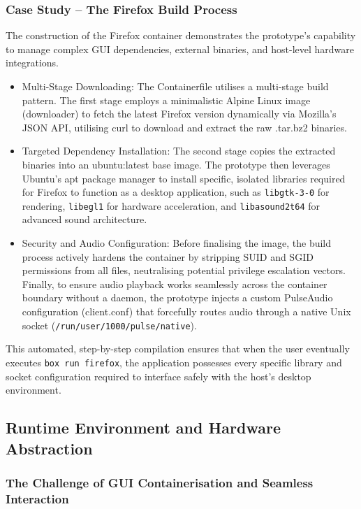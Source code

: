 \documentclass[journal,onecolumn]{IEEEtran}
\newcommand{\code}[1]{\texttt{#1}}
\begin{document}
\subsubsection{Case Study – The Firefox Build Process}
The construction of the Firefox container demonstrates the prototype's capability to manage complex GUI dependencies, external binaries, and host-level hardware integrations.
\begin{itemize}
    \item Multi-Stage Downloading: The Containerfile utilises a multi-stage build pattern. The first stage employs a minimalistic Alpine Linux image (downloader) to fetch the latest Firefox version dynamically via Mozilla's JSON API, utilising curl to download and extract the raw .tar.bz2 binaries.
    \item Targeted Dependency Installation: The second stage copies the extracted binaries into an ubuntu:latest base image. The prototype then leverages Ubuntu's apt package manager to install specific, isolated libraries required for Firefox to function as a desktop application, such as \code{libgtk-3-0} for rendering, \code{libegl1} for hardware acceleration, and \code{libasound2t64} for advanced sound architecture.

    \item Security and Audio Configuration: Before finalising the image, the build process actively hardens the container by stripping SUID and SGID permissions from all files, neutralising potential privilege escalation vectors. Finally, to ensure audio playback works seamlessly across the container boundary without a daemon, the prototype injects a custom PulseAudio configuration (client.conf) that forcefully routes audio through a native Unix socket (\code{/run/user/1000/pulse/native}).
\end{itemize}

This automated, step-by-step compilation ensures that when the user eventually executes \code{box run firefox}, the application possesses every specific library and socket configuration required to interface safely with the host's desktop environment.

\subsection{Runtime Environment and Hardware Abstraction}
\subsubsection{The Challenge of GUI Containerisation and Seamless Interaction}
\end{document}
